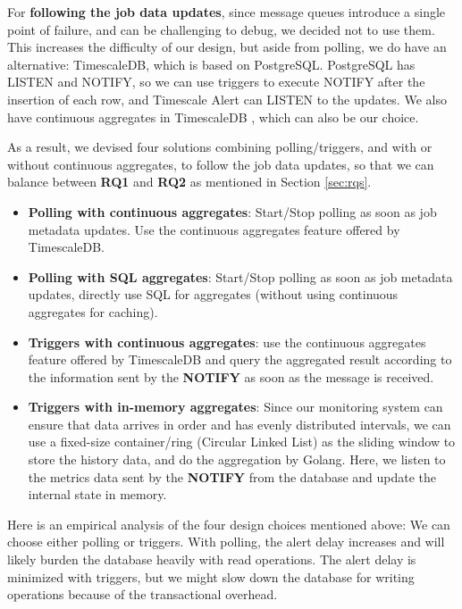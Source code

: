 For \textbf{following the job data updates}, since message queues introduce a single point of failure, and can be challenging to debug, we decided not to use them. This increases the difficulty of our design, but aside from polling, we do have an alternative: TimescaleDB, which is based on PostgreSQL. PostgreSQL has LISTEN and NOTIFY, so we can use triggers to execute NOTIFY after the insertion of each row, and Timescale Alert can LISTEN to the updates. We also have continuous aggregates in TimescaleDB \cite{ConAggs}, which can also be our choice.

As a result, we devised four solutions combining polling/triggers, and with or without continuous aggregates, to follow the job data updates, so that we can balance between \textbf{RQ1} and \textbf{RQ2} as mentioned in Section \ref{sec:rqs}.

\begin{itemize}
    \item \textbf{Polling with continuous aggregates}: Start/Stop polling as soon as job metadata updates. Use the continuous aggregates feature offered by TimescaleDB.

    \item \textbf{Polling with SQL aggregates}: Start/Stop polling as soon as job metadata updates, directly use SQL for aggregates (without using continuous aggregates for caching).

    \item \textbf{Triggers with continuous aggregates}: use the continuous aggregates feature offered by TimescaleDB and query the aggregated result according to the information sent by the \textbf{NOTIFY} as soon as the message is received.

    \item \textbf{Triggers with in-memory aggregates}: Since our monitoring system can ensure that data arrives in order and has evenly distributed intervals, we can use a fixed-size container/ring (Circular Linked List) as the sliding window to store the history data, and do the aggregation by Golang. Here, we listen to the metrics data sent by the \textbf{NOTIFY} from the database and update the internal state in memory. %
\end{itemize}

Here is an empirical analysis of the four design choices mentioned above: We can choose either polling or triggers. With polling, the alert delay increases and will likely burden the database heavily with read operations. The alert delay is minimized with triggers, but we might slow down the database for writing operations because of the transactional overhead.

